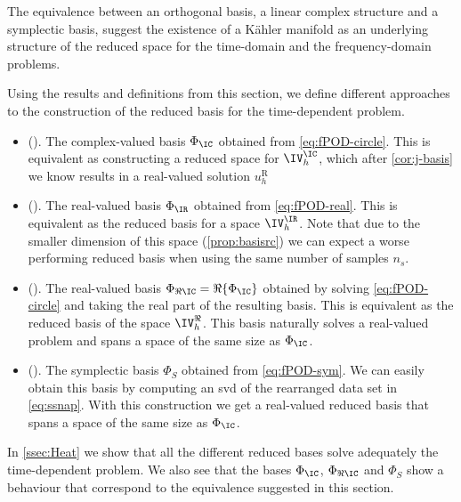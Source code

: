 \begin{remark}
    The equivalence between an orthogonal basis, a linear complex structure and a symplectic basis, suggest the existence of a Kähler manifold as an underlying structure of the reduced space for the time-domain and the frequency-domain problems.
\end{remark}


Using the results and definitions from this section, we define different approaches to the construction of the reduced basis for the time-dependent problem.
\begin{itemize}
    \item (). The complex-valued basis $\Phi_{\IC}$ obtained from \cref{eq:fPOD-circle}. This is equivalent as constructing a reduced space for $\IV_h^\IC$, which after \cref{cor:j-basis} we know results in a real-valued solution $u_h^{\textrm{R}}$
    \item (). The real-valued basis $\Phi_\IR$ obtained from \cref{eq:fPOD-real}. This is equivalent as the reduced basis for a space $\IV_h^\IR$. Note that due to the smaller dimension of this space (\cref{prop:basisrc}) we can expect a worse performing reduced basis when using the same number of samples $n_s$.
    \item (). The real-valued basis $\Phi_{\Re \IC}= \Re \{\Phi_{\IC} \}$ obtained by solving \cref{eq:fPOD-circle} and taking the real part of the resulting basis. This is equivalent as the reduced basis of the space $\IV_h^\Re$. This basis naturally solves a real-valued problem and spans a space of the same size as $\Phi_\IC$.
    \item (). The symplectic basis $\Phi_{S}$ obtained from \cref{eq:fPOD-sym}. We can easily obtain this basis by computing an \gls{svd} of the rearranged data set in \cref{eq:ssnap}. With this construction we get a real-valued reduced basis that spans a space of the same size as $\Phi_\IC$.
\end{itemize}
In \cref{ssec:Heat} we show that all the different reduced bases solve adequately the time-dependent problem. We also see that the bases $\Phi_{\IC}$, $\Phi_{\Re \IC}$ and $\Phi_{S}$ show a behaviour that correspond to the equivalence suggested in this section.